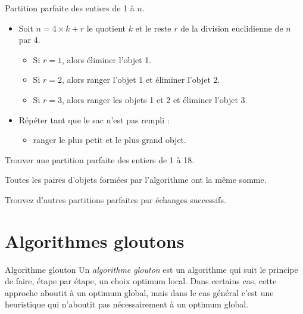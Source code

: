 \documentclass[11pt,a4paper]{article}
\begin{document}
  \begin{algorithme}{Partition parfaite des entiers de 1 à $n$.}
    \begin{itemize}
    \item Soit $n = 4 \times k + r$ le quotient $k$ et le reste $r$ de la division euclidienne de $n$ par 4.
      \begin{itemize}
      \item Si $r=1$, alors éliminer l'objet 1.
      \item Si $r=2$, alors ranger l'objet 1 et éliminer l'objet 2.
      \item Si $r=3$, alors ranger les objets 1 et 2 et éliminer l'objet 3.
      \end{itemize}
  \item Répéter tant que le sac n'est pas rempli :
    \begin{itemize}
    \item ranger le plus petit et le plus grand objet.
    \end{itemize}
  \end{itemize}
  \end{algorithme}

  \begin{exercice}[label=ex-16]{}
    Trouver une partition parfaite des entiers de 1 à 18.
  \end{exercice}


\begin{remarque}{}
  Toutes les paires d'objets formées par l'algorithme ont la même somme.
\end{remarque}


\begin{exercice}{}
  Trouvez d'autres partitions parfaites par échanges successifs.
\end{exercice}



  \section{Algorithmes gloutons}

  \begin{definition}{Algorithme glouton}
    Un \emph{algorithme glouton} est un algorithme qui suit le principe de faire, étape par étape, un choix optimum local.
    Dans certains cas, cette approche aboutit à un optimum global, mais dans le cas général c'est une heuristique qui n'aboutit pas nécessairement à un optimum global.
  \end{definition}
\end{document}
